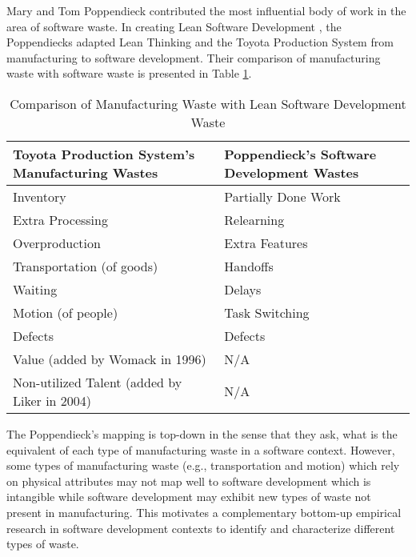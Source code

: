 Mary and Tom Poppendieck contributed the most influential body of work in the area of software waste. In creating Lean Software Development \cite{PoppendieckLeanSoftwareDevelopment}, the Poppendiecks adapted Lean Thinking and the Toyota Production System from manufacturing to software development. Their comparison of manufacturing waste with software waste is presented in Table \ref{ManufacturingVersusLeanSoftwareWaste}.
 
\begin{table}[t]
\renewcommand{\arraystretch}{1.5}
\centering
\caption{Comparison of Manufacturing Waste with Lean Software Development Waste}
\label{ManufacturingVersusLeanSoftwareWaste}
\begin{tabular}{|l|l|}
\hline
Toyota Production System's Manufacturing Wastes & Poppendieck's Software Development Wastes \\ \hline
Inventory                                       & Partially Done Work                       \\ \hline
Extra Processing                                & Relearning                                \\ \hline
Overproduction                                  & Extra Features                            \\ \hline
Transportation (of goods)                       & Handoffs                                  \\ \hline
Waiting                                         & Delays                                    \\ \hline
Motion (of people)                              & Task Switching                            \\ \hline
Defects                                         & Defects                                   \\ \hline
Value (added by Womack in 1996)                 & N/A                                       \\ \hline
Non-utilized Talent (added by Liker in 2004)     & N/A                                       \\ \hline
\end{tabular}
\end{table}

The Poppendieck's mapping is top-down in the sense that they ask, what is the equivalent of each type of manufacturing waste in a software context. However, some types of manufacturing waste (e.g., transportation and motion) which rely on physical attributes may not map well to software development which is intangible while software development may exhibit new types of waste not present in manufacturing. This motivates a complementary bottom-up empirical research in software development contexts to identify and characterize different types of waste. 

